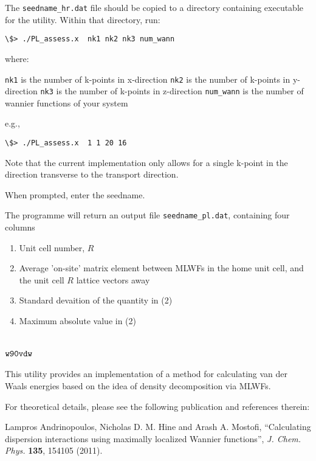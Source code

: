 The \verb|seedname_hr.dat| file should be copied to a directory containing
executable for the utility. Within that directory, run:

\begin{verbatim}
\$> ./PL_assess.x  nk1 nk2 nk3 num_wann 
\end{verbatim}

where:

 \verb|nk1| is the number of k-points in x-direction
 \verb|nk2| is the number of k-points in y-direction
 \verb|nk3| is the number of k-points in z-direction
 \verb|num_wann| is the number of wannier functions of your system

e.g.,

\begin{verbatim} 
\$> ./PL_assess.x  1 1 20 16
\end{verbatim}

Note that the current implementation only allows for a single k-point
in the direction transverse to the transport direction.

When prompted, enter the seedname.

The programme will return an output file \verb|seedname_pl.dat|, containing four columns
\begin{enumerate}
        \item Unit cell number, $R$
        \item Average 'on-site' matrix element between MLWFs in 
             the home unit cell, and the unit cell $R$ lattice
             vectors away
        \item Standard devaition of the quantity in (2)
        \item Maximum absolute value in (2)
\end{enumerate}

\section{$\tt{w90vdw}$}
\label{sec:w90vdw}

This utility provides an implementation of a method for calculating
van der Waals energies based on the idea of density decomposition via
MLWFs. 

For theoretical details, please see the following publication
and references therein:

Lampros Andrinopoulos, Nicholas D. M. Hine and Arash A. Mostofi, 
``Calculating dispersion interactions using maximally localized
Wannier functions'', \emph{J. Chem. Phys.} \textbf{135}, 154105 (2011).

